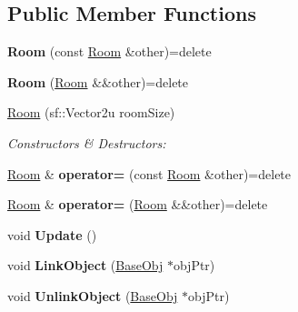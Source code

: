 \subsection*{Public Member Functions}
\begin{DoxyCompactItemize}
\item 
\hypertarget{class_helios_1_1_room_adde05da30e6a7923349d3682f77a595e}{}{\bfseries Room} (const \hyperlink{class_helios_1_1_room}{Room} \&other)=delete\label{class_helios_1_1_room_adde05da30e6a7923349d3682f77a595e}

\item 
\hypertarget{class_helios_1_1_room_a49dee88dbca1430546f49dedda0ef88a}{}{\bfseries Room} (\hyperlink{class_helios_1_1_room}{Room} \&\&other)=delete\label{class_helios_1_1_room_a49dee88dbca1430546f49dedda0ef88a}

\item 
\hypertarget{class_helios_1_1_room_a069b54c002742b2e943e281520654d43}{}\hyperlink{class_helios_1_1_room_a069b54c002742b2e943e281520654d43}{Room} (sf\+::\+Vector2u room\+Size)\label{class_helios_1_1_room_a069b54c002742b2e943e281520654d43}

\begin{DoxyCompactList}\small\item\em Constructors \& Destructors\+: \end{DoxyCompactList}\item 
\hypertarget{class_helios_1_1_room_ac4529d35e99e767f434e0c33f922257a}{}\hyperlink{class_helios_1_1_room}{Room} \& {\bfseries operator=} (const \hyperlink{class_helios_1_1_room}{Room} \&other)=delete\label{class_helios_1_1_room_ac4529d35e99e767f434e0c33f922257a}

\item 
\hypertarget{class_helios_1_1_room_a9f5645c1ec1a46c98ee7621c7a327723}{}\hyperlink{class_helios_1_1_room}{Room} \& {\bfseries operator=} (\hyperlink{class_helios_1_1_room}{Room} \&\&other)=delete\label{class_helios_1_1_room_a9f5645c1ec1a46c98ee7621c7a327723}

\item 
\hypertarget{class_helios_1_1_room_aeb4ac37cb202acbe6b0f95c3f06ebb9d}{}void {\bfseries Update} ()\label{class_helios_1_1_room_aeb4ac37cb202acbe6b0f95c3f06ebb9d}

\item 
\hypertarget{class_helios_1_1_room_a1dc648407daeb69bed664c1b6aca899d}{}void {\bfseries Link\+Object} (\hyperlink{class_helios_1_1_base_obj}{Base\+Obj} $\ast$obj\+Ptr)\label{class_helios_1_1_room_a1dc648407daeb69bed664c1b6aca899d}

\item 
\hypertarget{class_helios_1_1_room_ae94868797f3224f81604193f7e6e9af0}{}void {\bfseries Unlink\+Object} (\hyperlink{class_helios_1_1_base_obj}{Base\+Obj} $\ast$obj\+Ptr)\label{class_helios_1_1_room_ae94868797f3224f81604193f7e6e9af0}

\end{DoxyCompactItemize}


